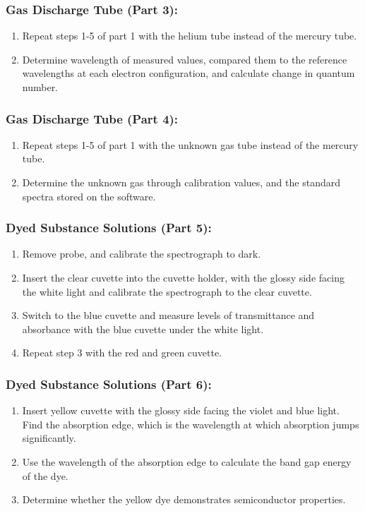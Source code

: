 \documentclass[10pt, letterpaper, twoside]{article}
\begin{document}
\subsubsection{Gas Discharge Tube (Part 3):}

\begin{enumerate}
    \item Repeat steps 1-5 of part 1 with the helium tube instead of the mercury tube.
    \item Determine wavelength of measured values, compared them to the reference wavelengths at each electron configuration, and calculate change in quantum number.
\end{enumerate}

\subsubsection{Gas Discharge Tube (Part 4):}

\begin{enumerate}
    \item Repeat steps 1-5 of part 1 with the unknown gas tube instead of the mercury tube.
    \item Determine the unknown gas through calibration values, and the standard spectra stored on the software.
\end{enumerate}

\subsubsection{Dyed Substance Solutions (Part 5):}

\begin{enumerate}
    \item Remove probe, and calibrate the spectrograph to dark.
    \item Insert the clear cuvette into the cuvette holder, with the glossy side facing the white light and calibrate the spectrograph to the clear cuvette.
    \item Switch to the blue cuvette and measure levels of transmittance and absorbance with the blue cuvette under the white light.
    \item Repeat step 3 with the red and green cuvette.
\end{enumerate}

\subsubsection{Dyed Substance Solutions (Part 6):}
\begin{enumerate}
    \item Insert yellow cuvette with the glossy side facing the violet and blue light. Find the absorption edge, which is the wavelength at which absorption jumps significantly.
    \item Use the wavelength of the absorption edge to calculate the band gap energy of the dye.
    \item Determine whether the yellow dye demonstrates semiconductor properties.
\end{enumerate}
\end{document}
